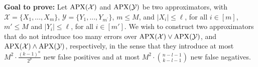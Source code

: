





% 
% 



\begin{tcolorbox}[colframe=white, colback=gray!11, boxrule=0mm, sharp corners]
\textbf{Goal to prove:}
Let $\operatorname{\mathrm{APX}}(\mathcal X)$ and 
$\operatorname{\mathrm{APX}}(\mathcal Y)$ be 
two approximators,
with $\mathcal{X}=\{X_1, \ldots, X_m\}$, 
$\mathcal{Y}=\{Y_1, \ldots, Y_{m^{\prime}}\}$, $m\le M$, and $\left|X_i\right| \leq \ell $, for all $i\in[m]$, $m'\le M $ and $\left|Y_i\right| \leq \ell$, for all $i\in[m']$.
We wish to construct   two approximators that do not introduce too many errors over  $\mathrm{APX}(\mathcal{X}) \vee \mathrm{APX}(\mathcal{Y})$, and $\operatorname{\mathrm{APX}}(\mathcal X) \wedge 
\operatorname{\mathrm{APX}}(\mathcal Y)$, respectively,
in the sense that they introduce at most $M^2 \cdot \frac{(k-1)^n}{2^p}$ new false positives and at most $M^2 \cdot\binom{n-l-1}{k-l-1}$  new false negatives.\end{tcolorbox}



